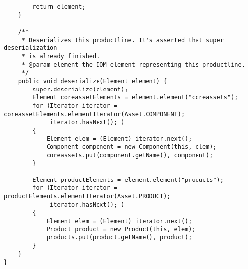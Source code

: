 \begin{verbatim}
		return element;
	}

	/**
	 * Deserializes this productline. It's asserted that super deserialization
	 * is already finished.
	 * @param element the DOM element representing this productline.
	 */
	public void deserialize(Element element) {
		super.deserialize(element);
	    Element coreassetElements = element.element("coreassets");
		for (Iterator iterator = coreassetElements.elementIterator(Asset.COMPONENT);
			 iterator.hasNext(); )
		{
			Element elem = (Element) iterator.next();
			Component component = new Component(this, elem);
			coreassets.put(component.getName(), component);
		}
		
		Element productElements = element.element("products");
		for (Iterator iterator = productElements.elementIterator(Asset.PRODUCT);
			 iterator.hasNext(); )
		{
			Element elem = (Element) iterator.next();
			Product product = new Product(this, elem);
			products.put(product.getName(), product);
		}
	}
}
\end{verbatim}

